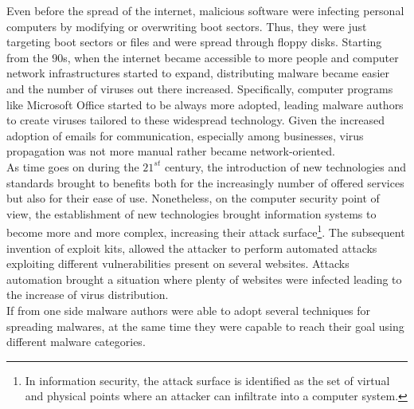 \documentclass[LaM,binding=0.6cm]{sapthesis}
\begin{document}
Even before the spread of the internet, malicious software were infecting personal computers by modifying or overwriting boot sectors. Thus, they were just targeting boot sectors or files and were spread through floppy disks. Starting from the $90$s, when the internet became accessible to more people and computer network infrastructures started to expand, distributing malware became easier and the number of viruses out there increased. Specifically, computer programs like Microsoft Office started to be always more adopted, leading malware authors to create viruses tailored to these widespread technology. Given the increased adoption of emails for communication, especially among businesses, virus propagation was not more manual rather became network-oriented.\\
As time goes on during the $21^{st}$ century, the introduction of new technologies and standards brought to benefits both for the increasingly number of offered services but also for their ease of use. Nonetheless, on the computer security point of view, the establishment of new technologies brought information systems to become more and more complex, increasing their attack surface\footnote{In information security, the attack surface is identified as the set of virtual and physical points where an attacker can infiltrate into a computer system\cite{AttackSu36:online}.}. The subsequent invention of exploit kits, allowed the attacker to perform automated attacks exploiting different vulnerabilities present on several websites. Attacks automation brought a situation where plenty of websites were infected leading to the increase of virus distribution.\\
If from one side malware authors were able to adopt several techniques for spreading malwares, at the same time they were capable to reach their goal using different malware categories. 
\end{document}
